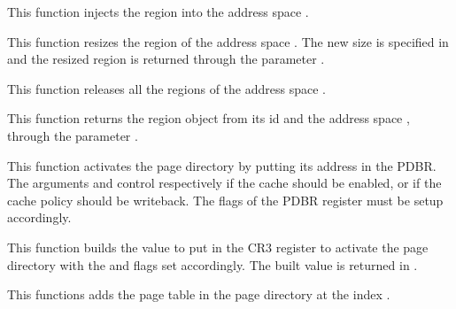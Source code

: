 {
  This function injects the region  into the address space
  . 
}

{
  This function resizes the region  of the address space
  . The new size is specified in  and the resized
  region is returned through the parameter .
}

{
  This function releases all the regions of the address space .
}

{
  This function returns the region object from its id  and the
  address space , through the parameter .
}

{
  This function activates the page directory  by putting its
  address in the PDBR. The arguments  and 
  control respectively if the cache should be enabled, or if the cache policy
  should be writeback. The flags of the PDBR register must be setup accordingly.
  
}

{
  This function builds the value to put in the CR3 register to activate the page
  directory  with the  and  flags
  set accordingly. The built value is returned in .
}

{
  This functions adds the page table  in the page directory
   at the index .
}

